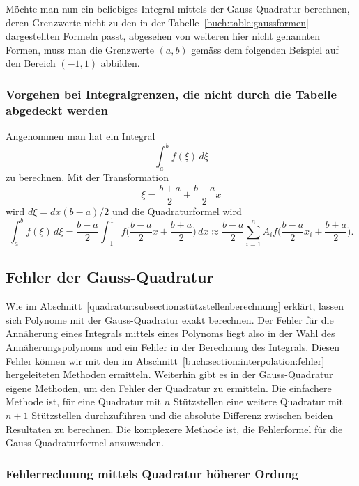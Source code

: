Möchte man nun ein beliebiges Integral mittels der Gauss-Quadratur berechnen,
deren Grenzwerte nicht zu den in der Tabelle~\ref{buch:table:gaussformen} 
dargestellten Formeln passt, 
abgesehen von weiteren hier nicht genannten Formen, 
muss man die Grenzwerte $(a, b)$ gemäss dem folgenden Beispiel
auf den Bereich $(-1, 1)$ abbilden.

\subsubsection{Vorgehen bei Integralgrenzen, die nicht durch die Tabelle abgedeckt werden}

Angenommen man hat ein Integral
\begin{equation}
    \int_{a}^{b}f(\xi)\,d\xi
\end{equation}
zu berechnen.
Mit der Transformation
\begin{equation}
    \xi = \frac{b + a}{2} + \frac{b - a}{2} x    
\end{equation}
wird $d\xi = dx(b - a)/2$ und die Quadraturformel wird
\begin{equation}
    \int_{a}^{b}f(\xi)\,d\xi 
    =
    \frac{b - a}{2} \int_{-1}^{1}f\bigg(\frac{b - a}{2}x + \frac{b + a}{2}\bigg)\, dx 
    \approx
     \frac{b - a}{2} \sum_{i=1}^{n} A_{i}f\bigg(\frac{b - a}{2}x_{i} + \frac{b + a}{2}\bigg).
\end{equation}

\subsection{Fehler der Gauss-Quadratur
\label{quadratur:subsection:gaussfehler}}
Wie im Abschnitt~\ref{quadratur:subsection:stützstellenberechnung} erklärt,
lassen sich Polynome mit der Gauss-Quadratur exakt berechnen. 
Der Fehler für die Annäherung eines Integrals mittels eines Polynoms liegt
also in der Wahl des Annäherungspolynoms und ein Fehler in der Berechnung des Integrals.
Diesen Fehler können wir mit den im Abschnitt~\ref{buch:section:interpolation:fehler}
hergeleiteten Methoden ermitteln.
Weiterhin gibt es in der Gauss-Quadratur eigene Methoden, 
um den Fehler der Quadratur zu ermitteln. 
Die einfachere Methode ist, für eine Quadratur mit $n$ Stützstellen eine weitere
Quadratur mit $n+1$ Stützstellen durchzuführen und die absolute Differenz
zwischen beiden Resultaten zu berechnen. 
Die komplexere Methode ist, 
die Fehlerformel für die Gauss-Quadraturformel anzuwenden. 

\subsubsection{Fehlerrechnung mittels Quadratur höherer Ordung}

